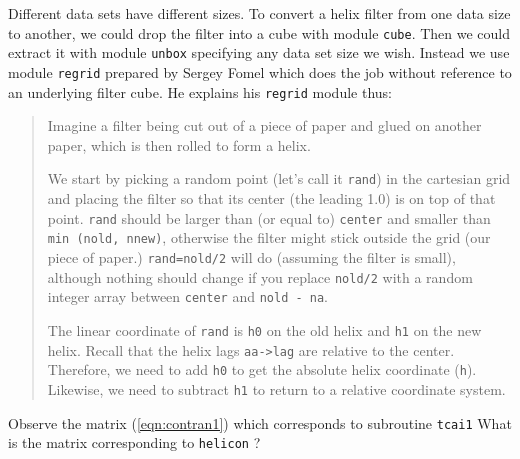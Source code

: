 \par
Different data sets have different sizes.
To convert a helix filter from one data size to another,
we could drop the filter into a cube with module \texttt{cube}.
Then we could extract it with module \texttt{unbox}
specifying any data set size we wish.
Instead we use module
\texttt{regrid} %
prepared by Sergey Fomel
which does the job without reference to an underlying filter cube.
He explains his \texttt{regrid} module thus:
        \begin{quotation}
        Imagine a filter being cut out of a piece of paper and
        glued on another paper, which is then rolled to form a helix.
\par            %
        We start by picking a random point (let's call it
        \texttt{rand}) in the
        cartesian grid and placing the filter so that its center
        (the leading 1.0) is on top of that point.
        \texttt{rand} should be larger than (or equal to)
        \texttt{center} and
        smaller than \texttt{min (nold, nnew)},
        otherwise the filter might stick outside the grid
        (our piece of paper.)
        \texttt{rand=nold/2} will do (assuming the filter is small),
        although nothing should change
        if you replace \texttt{nold/2} with a random integer array
        between \texttt{center} and \texttt{nold - na}.
\par
        The linear coordinate of \texttt{rand} is \texttt{h0}
        on the old helix and \texttt{h1} on the new helix.
        Recall that the helix lags \verb#aa->lag#
        are relative to the center.
        Therefore, we need to add \texttt{h0}
        to get the absolute helix coordinate (\texttt{h}).
        Likewise, we need to subtract \texttt{h1}
        to return to a relative coordinate system.
        \end{quotation}



\begin{exer}
\item
Observe the matrix
(\ref{eqn:contran1})
which corresponds to
subroutine
\texttt{tcai1}
What is the matrix corresponding to
\texttt{helicon} ?
\end{exer}


\clearpage

